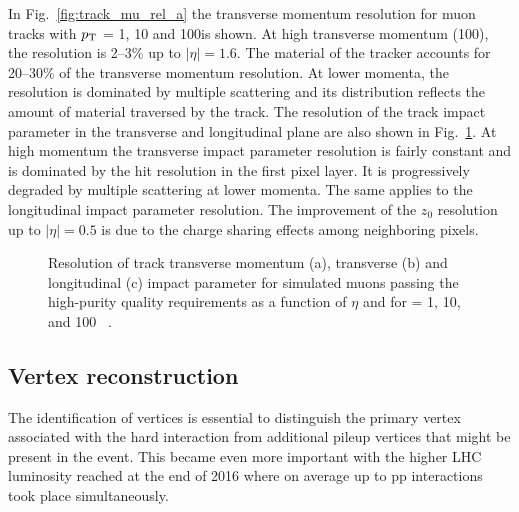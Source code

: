 In Fig.~\ref{fig:track_mu_rel_a} the transverse momentum resolution for muon tracks with $p_{\mathrm{T}}$ = 1, 10 and 100\GeV is shown. At high transverse momentum (100\GeV), the resolution is 2--3\% up to $|\eta| = 1.6$.
The material of the tracker accounts for 20--30\% of the transverse momentum resolution.
At lower momenta, the resolution is dominated by multiple scattering and its distribution reflects the amount of material traversed by the track.
The resolution of the track impact parameter in the transverse and longitudinal plane are also shown in Fig.~\ref{fig:track_mu_rel}. At high momentum the transverse impact parameter resolution is fairly constant and is dominated by the hit resolution in the first pixel layer. It is progressively degraded by multiple scattering at lower momenta. The same applies to the longitudinal impact parameter resolution. The improvement of the $z_0$ resolution up to $|\eta| = 0.5$ is due to the charge sharing effects among neighboring pixels.

\begin{figure}[!htb]
\centering
{}
\caption{Resolution of track transverse momentum (a), transverse (b) and longitudinal (c) impact parameter for simulated muons passing the high-purity quality requirements as a function of $\eta$ and for \pt = 1, 10, and 100 \GeV~\cite{Chatrchyan:2014fea}.}
\label{fig:track_mu_rel}
\end{figure}

\subsection{Vertex reconstruction}

The identification of vertices is essential to distinguish the primary vertex associated with the hard interaction from additional pileup vertices that might be present in the event. This became even more important with the higher LHC luminosity reached at the end of 2016 where on average up to  pp interactions took place simultaneously.

